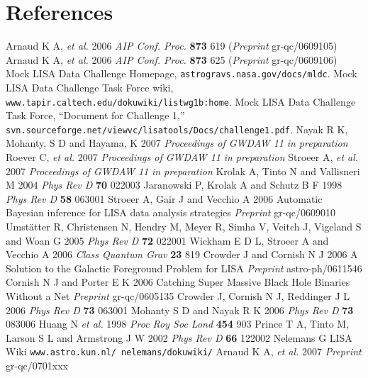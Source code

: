 \documentclass[12pt]{iopart}
\begin{document}
\section*{References}
\begin{thebibliography}{10}
 Arnaud K A, {\it et al.} 2006 {\it AIP Conf. Proc.} {\bf 873} 619 ({\it Preprint} gr-qc/0609105)
 Arnaud K A, {\it et al.} 2006 {\it AIP Conf. Proc.} {\bf 873} 625 ({\it Preprint} gr-qc/0609106)
 Mock LISA Data Challenge Homepage, {\tt astrogravs.nasa.gov/docs/mldc}.
 Mock LISA Data Challenge Task Force wiki, {\tt www.tapir.caltech.edu/dokuwiki/listwg1b:home}.
 Mock LISA Data Challenge Task Force, ``Document for Challenge 1,'' {\tt svn.sourceforge.net/viewvc/lisatools/Docs/challenge1.pdf}.
 Nayak R K, Mohanty, S D and Hayama, K 2007 {\it Proceedings of GWDAW 11} {\it in preparation}
 Roever C, {\it et al.} 2007 {\it Proceedings of GWDAW 11} {\it in preparation}
 Stroeer A, {\it et al.} 2007 {\it Proceedings of GWDAW 11} {\it in preparation}
 Krolak A, Tinto N and Vallisneri M 2004 {\it Phys Rev D} {\bf 70} 022003
 Jaranowski P, Krolak A and Schutz B F 1998 {\it Phys Rev D} {\bf 58} 063001
 Stroeer A, Gair J and Vecchio A 2006 Automatic Bayesian inference for LISA data analysis strategies {\it Preprint} gr-qc/0609010
 Umst\"{a}tter R, Christensen N, Hendry M, Meyer R, Simha V, Veitch J, Vigeland S and Woan G 2005 {\it Phys Rev D} {\bf 72} 022001
 Wickham E D L, Stroeer A and Vecchio A 2006 {\it Class Quantum Grav} {\bf 23} 819
 Crowder J and Cornish N J 2006 A Solution to the Galactic Foreground Problem for LISA {\it Preprint} astro-ph/0611546
 Cornish N J and Porter E K 2006 Catching Super Massive Black Hole Binaries Without a Net {\it Preprint} gr-qc/0605135
 Crowder J, Cornish N J, Reddinger J L 2006 {\it Phys Rev D} {\bf 73} 063001
 Mohanty S D and Nayak R K 2006 {\it Phys Rev D} {\bf 73} 083006
 Huang N {\it et al.} 1998 {\it Proc Roy Soc Lond} {\bf 454} 903
 Prince T A, Tinto M, Larson S L and Armstrong J W 2002 {\it Phys Rev D} {\bf 66} 122002
 Nelemans G LISA Wiki {\tt www.astro.kun.nl/~nelemans/dokuwiki/}
 Arnaud K A, {\it et al.} 2007 {\it Preprint} gr-qc/0701xxx

\end{thebibliography}
\end{document}
